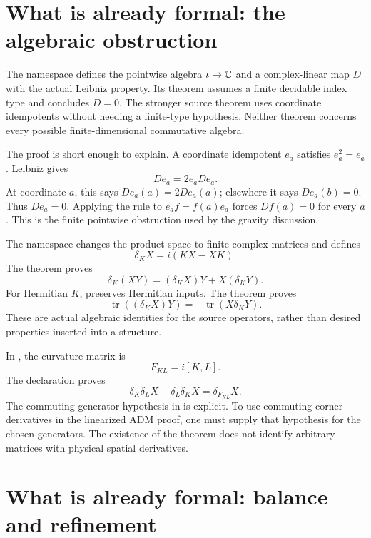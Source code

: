 \clearpage
\section{What is already formal: the algebraic obstruction}\label{c:verify:formalalgebra}

The namespace  defines the pointwise algebra \(\iota\to\mathbb C\) and a complex-linear map \(D\) with the actual Leibniz property. Its theorem  assumes a finite decidable index type and concludes \(D=0\). The stronger source theorem  uses coordinate idempotents without needing a finite-type hypothesis. Neither theorem concerns every possible finite-dimensional commutative algebra.

The proof is short enough to explain. A coordinate idempotent \(e_a\) satisfies \(e_a^2=e_a\). Leibniz gives
\[
 D e_a=2e_aD e_a.
\]
At coordinate \(a\), this says \(D e_a(a)=2D e_a(a)\); elsewhere it says \(D e_a(b)=0\). Thus \(D e_a=0\). Applying the rule to \(e_af=f(a)e_a\) forces \(D f(a)=0\) for every \(a\). This is the finite pointwise obstruction used by the gravity discussion.

The namespace  changes the product space to finite complex matrices and defines
\[
 \delta_KX=i(KX-XK).
\]
The theorem  proves
\[
 \delta_K(XY)=(\delta_KX)Y+X(\delta_KY).
\]
For Hermitian \(K\),  preserves Hermitian inputs. The theorem  proves
\[
 \operatorname{tr}((\delta_KX)Y)
 =-\operatorname{tr}(X\delta_KY).
\]
These are actual algebraic identities for the source operators, rather than desired properties inserted into a structure.

In , the curvature matrix is
\[
 F_{KL}=i[K,L].
\]
The declaration  proves
\[
 \delta_K\delta_LX-\delta_L\delta_KX=\delta_{F_{KL}}X.
\]
The commuting-generator hypothesis in  is explicit. To use commuting corner derivatives in the linearized ADM proof, one must supply that hypothesis for the chosen generators. The existence of the theorem does not identify arbitrary matrices with physical spatial derivatives.



\clearpage
\section{What is already formal: balance and refinement}\label{c:verify:formalrefinement}

